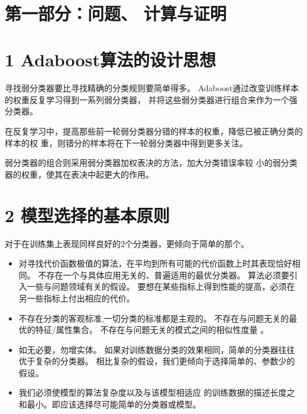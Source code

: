 \documentclass{article}
\title{
    \vspace{2in}
    \textmd{\textbf{\courseName}}\\
    \textmd{\homeworkTitle}\\ %
    \vspace{0.1in}
    \large{\studentName}\\
    \large{\studentId}\\
    \vspace{3in}
}
\begin{document}
\maketitle
\date{}
\pagebreak

\section*{第一部分：问题、 计算与证明}
\section*{1 Adaboost算法的设计思想}
寻找弱分类器要比寻找精确的分类规则要简单得多。
Adaboost通过改变训练样本的权重反复学习得到一系列弱分类器，
并将这些弱分类器进行组合来作为一个强分类器。

在反复学习中，提高那些前一轮弱分类器分错的样本的权重，降低已被正确分类的样本的权
重，则错分的样本将在下一轮弱分类器中得到更多关注。

弱分类器的组合则采用弱分类器加权表决的方法，加大分类错误率较
小的弱分类器的权重，使其在表决中起更大的作用。

\section*{2 模型选择的基本原则}
对于在训练集上表现同样良好的2个分类器，更倾向于简单的那个。
\begin{itemize}
	\item {}
	对寻找代价函数极值的算法，在平均到所有可能的代价函数上时其表现恰好相同。
	不存在一个与具体应用无关的、普遍适用的最优分类器。
	算法必须要引入一些与问题领域有关的假设。
	要想在某些指标上得到性能的提高，必须在另一些指标上付出相应的代价。
	\item {} 不存在分类的客观标准,一切分类的标准都是主观的。
	不存在与问题无关的最优的特征/属性集合。
	不存在与问题无关的模式之间的相似性度量 。
	\item {}如无必要，勿增实体。
	如果对训练数据分类的效果相同，简单的分类器往往优于复杂的分类器。
	相比复杂的假设，我们更倾向于选择简单的、参数少的假设。
	\item {}我们必须使模型的算法复杂度以及与该模型相适应
	的训练数据的描述长度之和最小。即应该选择尽可能简单的分类器或模型。
\end{itemize}
\end{document}
